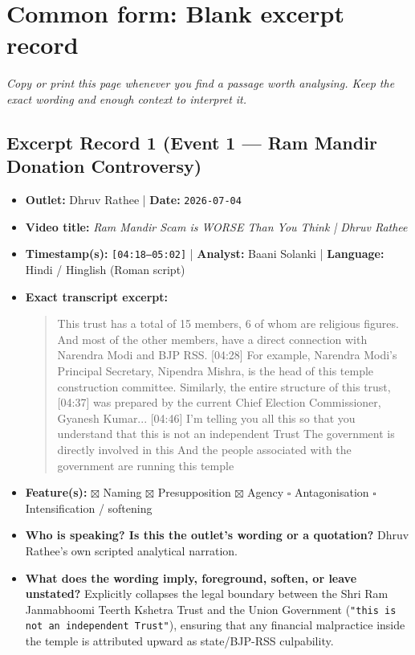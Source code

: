 \documentclass[10pt,a4paper]{article}
\begin{document}
\section*{Common form: Blank excerpt record}
\textit{Copy or print this page whenever you find a passage worth analysing. Keep the exact wording and enough context to interpret it.}


\subsection*{Excerpt Record 1 (Event 1 --- Ram Mandir Donation Controversy)}
\begin{itemize}[leftmargin=1.5em, itemsep=3pt, topsep=4pt]
  \item \textbf{Outlet:} Dhruv Rathee | \textbf{Date:} \texttt{2026-07-04}
  \item \textbf{Video title:} \textit{Ram Mandir Scam is WORSE Than You Think | Dhruv Rathee}
  \item \textbf{Timestamp(s):} \texttt{[04:18--05:02]} | \textbf{Analyst:} Baani Solanki | \textbf{Language:} Hindi / Hinglish (Roman script)
  \item \textbf{Exact transcript excerpt:}
    \begin{quote}\small\ttfamily [04:18] This trust has a total of 15 members, 6 of whom are religious figures. And most of the other members, have a direct connection with Narendra Modi and BJP RSS. [04:28] For example, Narendra Modi's Principal Secretary, Nipendra Mishra, is the head of this temple construction committee. Similarly, the entire structure of this trust, [04:37] was prepared by the current Chief Election Commissioner, Gyanesh Kumar... [04:46] I'm telling you all this so that you understand that this is not an independent Trust The government is directly involved in this And the people associated with the government are running this temple\end{quote}
  \item \textbf{Feature(s):} $\boxtimes$ Naming $\boxtimes$ Presupposition $\boxtimes$ Agency $\square$ Antagonisation $\square$ Intensification / softening
  \item \textbf{Who is speaking? Is this the outlet's wording or a quotation?} Dhruv Rathee's own scripted analytical narration.
  \item \textbf{What does the wording imply, foreground, soften, or leave unstated?} Explicitly collapses the legal boundary between the Shri Ram Janmabhoomi Teerth Kshetra Trust and the Union Government (\texttt{"this is not an independent Trust"}), ensuring that any financial malpractice inside the temple is attributed upward as state/BJP-RSS culpability.

\end{itemize}
\end{document}
